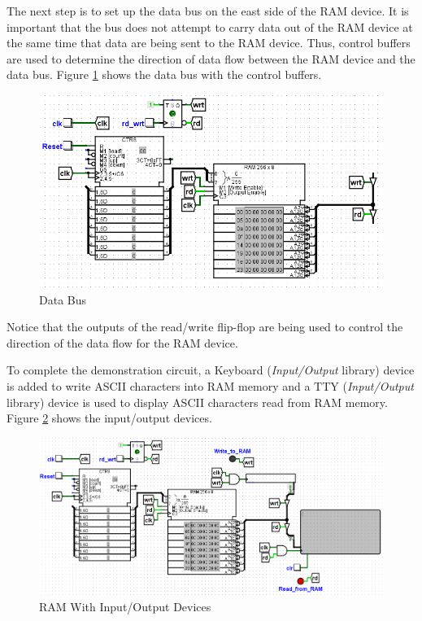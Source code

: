 The next step is to set up the data bus on the east side of the RAM device. It is important that the bus does not attempt to carry data out of the RAM device at the same time that data are being sent to the RAM device. Thus, control buffers are used to determine the direction of data flow between the RAM device and the data bus. Figure \ref{fig:10-03} shows the data bus with the control buffers.

\begin{figure}[H]
	\centering
	\includegraphics[width=\maxwidth{.95\linewidth}]{gfx/10-03}
	\caption{Data Bus}
	\label{fig:10-03}
\end{figure}

Notice that the outputs of the read/write flip-flop are being used to control the direction of the data flow for the RAM device.

To complete the demonstration circuit, a Keyboard (\textit{Input/Output} library) device is added to write ASCII characters into RAM memory and a TTY (\textit{Input/Output} library) device is used to display ASCII characters read from RAM memory. Figure \ref{fig:10-04} shows the input/output devices.

\begin{figure}[H]
	\centering
	\includegraphics[width=\maxwidth{.95\linewidth}]{gfx/10-04}
	\caption{RAM With Input/Output Devices}
	\label{fig:10-04}
\end{figure}

